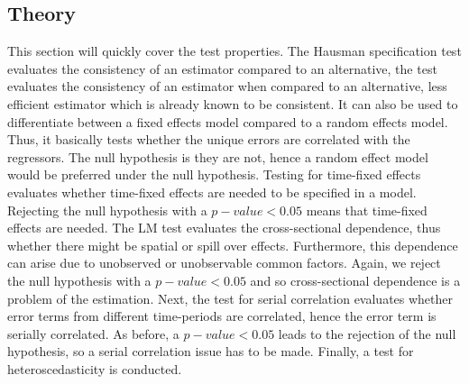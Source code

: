 \documentclass[a4paper]{article}
\begin{document}
{\subsection{Theory}
This section will quickly cover the test properties.
The Hausman specification test evaluates the consistency of an estimator compared to an alternative, the test evaluates the consistency of an estimator when compared to an alternative, less efficient estimator which is already known to be consistent. It can also be used to differentiate between a fixed effects model compared to a random effects model. Thus, it basically tests whether the unique errors are correlated with the regressors. The null hypothesis is they are not, hence a random effect model would be preferred under the null hypothesis. \newline
Testing for time-fixed effects evaluates whether time-fixed effects are needed to be specified in a model. Rejecting the null hypothesis with a $p-value < 0.05$ means that time-fixed effects are needed. The LM test evaluates the cross-sectional dependence, thus whether there might be spatial or spill over effects. Furthermore, this dependence can arise due to unobserved or unobservable common factors. Again, we reject the null hypothesis with a $p-value < 0.05$ and so cross-sectional dependence is a problem of the estimation. Next, the test for serial correlation evaluates whether error terms from different time-periods are correlated, hence the error term is serially correlated. As before, a $p-value < 0.05$ leads to the rejection of the null hypothesis, so a serial correlation issue has to be made. Finally, a test for heteroscedasticity is conducted. 


}
\end{document}
